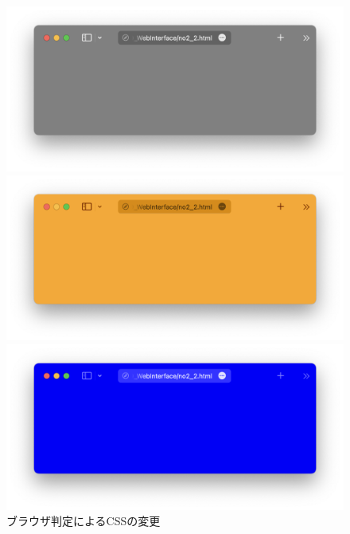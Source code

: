 \begin{figure}[H]
    \centering
    \begin{minipage}{.30\textwidth}
        \centering
        \includegraphics[keepaspectratio,width=\textwidth]{../../09_WebInterface/no2_gray.png}
    \end{minipage}
    \begin{minipage}{.30\textwidth}
        \centering
        \includegraphics[keepaspectratio,width=\textwidth]{../../09_WebInterface/no2_orange.png}
    \end{minipage}
    \begin{minipage}{.30\textwidth}
        \centering
        \includegraphics[keepaspectratio,width=\textwidth]{../../09_WebInterface/no2_blue.png}
    \end{minipage}
    \caption{ブラウザ判定によるCSSの変更}
\end{figure}
